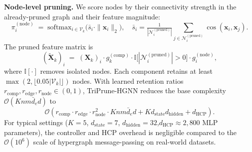 \documentclass[10pt]{article}
\theoremstyle{plain}
\theoremstyle{definition}
\begin{document}
\textbf{Node-level pruning.} We score nodes by their connectivity strength in the already-pruned graph and their feature magnitude:
\begin{equation}
\pi_i^{(\mathrm{node})} \;=\;
\mathrm{softmax}_{i\in\mathcal{V}_k}
\!\big(\bar{s}_i\cdot\|\mathbf{x}_i\|_2\big),
\quad
\bar{s}_i = \tfrac{1}{|\mathcal{N}_i^{(\mathrm{pruned})}|}
\!\!\sum_{j\in\mathcal{N}_i^{(\mathrm{pruned})}}
\!\!\cos(\mathbf{x}_i,\mathbf{x}_j).
\label{eq:node_importance}
\end{equation}
The pruned feature matrix is
\begin{equation}
(\widetilde{\mathbf{X}}_k)_i \;=\;
(\mathbf{X}_k)_i\cdot g_k^{(\mathrm{comp})}\cdot
\mathbb{I}\big[|\mathcal{N}_i^{(\mathrm{pruned})}|>0\big]\cdot
g_i^{(\mathrm{node})},
\label{eq:pruned_X}
\end{equation}
where $\mathbb{I}[\cdot]$ removes isolated nodes. Each component retains at least $\max(2,\lfloor 0.05|\mathcal{V}_k|\rfloor)$ nodes. With learned retention ratios $r_{\mathrm{comp}},r_{\mathrm{edge}},r_{\mathrm{node}}\in(0,1)$, TriPrune-HGNN reduces the base complexity $\mathcal{O}(Knm\bar{d}_e d)$ to
\begin{equation}
\mathcal{O}\!\left(r_{\mathrm{comp}}\!\cdot r_{\mathrm{edge}}\!\cdot
r_{\mathrm{node}}^{2}\!\cdot Knm\bar{d}_e d
+ Kd_{\mathrm{state}}d_{\mathrm{hidden}}
+ d_{\mathrm{HCP}}\right).
\label{eq:complexity}
\end{equation}
For typical settings ($K=5$, $d_{\mathrm{state}}=7$, $d_{\mathrm{hidden}}=32$,$d_{\mathrm{HCP}}\approx 2{,}800$ MLP parameters), the controller and HCP overhead is negligible compared to the $\mathcal{O}(10^6)$ scale of hypergraph message-passing on real-world datasets.
\end{document}
